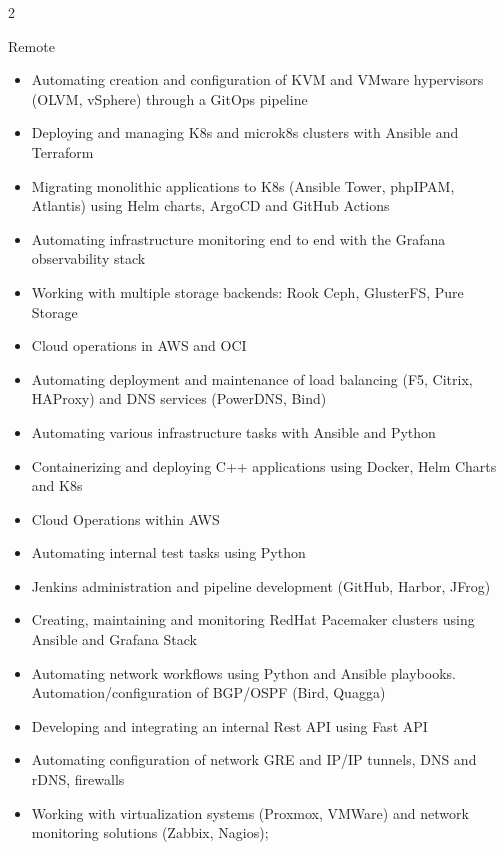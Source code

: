 \documentclass[10pt,a4paper,ragged2e,withhyper]{altacv}
\begin{document}


\makecvheader


\begin{paracol}{2}

{Remote}
\begin{itemize}
\item Automating creation and configuration of KVM and VMware hypervisors (OLVM, vSphere) through a GitOps pipeline
\item Deploying and managing K8s and microk8s clusters with Ansible and Terraform
\item Migrating monolithic applications to K8s (Ansible Tower, phpIPAM, Atlantis) using Helm charts, ArgoCD and GitHub Actions
\item Automating infrastructure monitoring end to end with the Grafana observability stack
\item Working with multiple storage backends: Rook Ceph, GlusterFS, Pure Storage
\item Cloud operations in AWS and OCI
\item Automating deployment and maintenance of load balancing (F5, Citrix, HAProxy) and DNS services (PowerDNS, Bind)
\item Automating various infrastructure tasks with Ansible and Python
\end{itemize}
\divider
{}
\begin{itemize}
\item Containerizing and deploying C++ applications using Docker, Helm Charts and K8s
\item Cloud Operations within AWS
\item Automating internal test tasks using Python
\item Jenkins administration and pipeline development (GitHub, Harbor, JFrog)
\item Creating, maintaining and monitoring RedHat Pacemaker clusters using Ansible and Grafana Stack
\end{itemize}

\divider

\begin{itemize}
\item Automating network workflows using Python and Ansible playbooks. Automation/configuration of BGP/OSPF (Bird, Quagga)
\item Developing and integrating an internal Rest API using Fast API
\item Automating configuration of network GRE and IP/IP tunnels, DNS and rDNS, firewalls
\item Working with virtualization systems (Proxmox, VMWare) and network monitoring solutions (Zabbix, Nagios);
\end{itemize}


\end{paracol}
\end{document}
